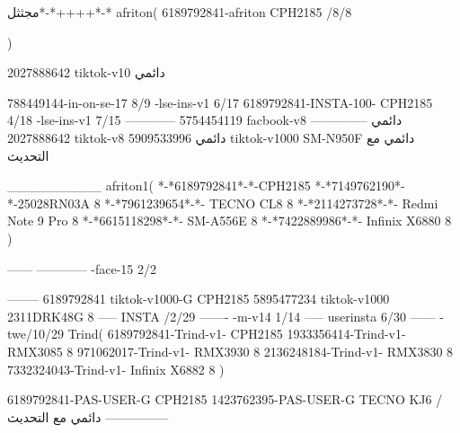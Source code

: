 مجثثل*-*++++*-*
afriton(
6189792841-afriton CPH2185  /8/8

)

2027888642 tiktok-v10
دائمي

788449144-in-on-se-17 8/9
-lse-ins-v1 6/17
6189792841-INSTA-100- CPH2185 4/18
-lse-ins-v1 7/15
------------
5754454119 facbook-v8
دائمي
--------------
2027888642 tiktok-v8
دائمي
5909533996 tiktok-v1000  SM-N950F
دائمي مع التحديث

__________
afriton1(
*-*6189792841*-*-CPH2185
*-*7149762190*-*-25028RN03A  8
*-*7961239654*-*- TECNO CL8  8
*-*2114273728*-*- Redmi Note 9 Pro  8
*-*6615118298*-*- SM-A556E  8
*-*7422889986*-*- Infinix X6880  8
)


------
------------
-face-15 2/2

--------
6189792841 tiktok-v1000-G CPH2185 
5895477234 tiktok-v1000 2311DRK48G 8
-----
 INSTA /2/29
-------
-m-v14 1/14
-----
userinsta 6/30
------
-twe/10/29
Trind(
6189792841-Trind-v1- CPH2185 
1933356414-Trind-v1- RMX3085 8
971062017-Trind-v1- RMX3930 8
2136248184-Trind-v1- RMX3830 8
7332324043-Trind-v1- Infinix X6882 8
)


6189792841-PAS-USER-G CPH2185 
1423762395-PAS-USER-G TECNO KJ6  /دائمي مع التحديث
    ---------------
